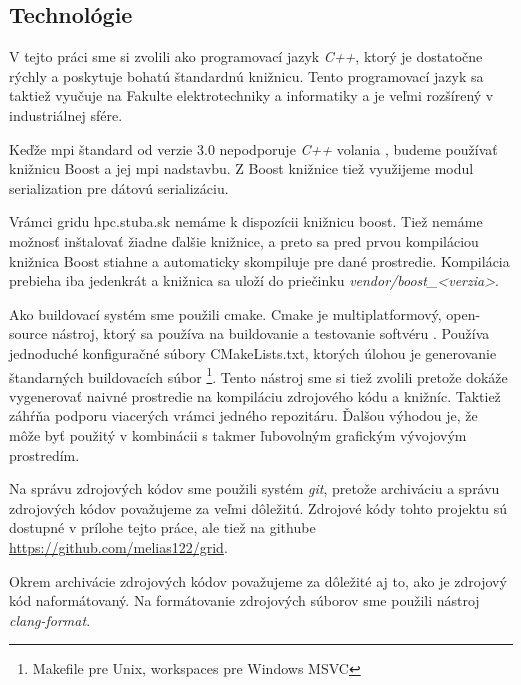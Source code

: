 \subsection{Technológie}
V tejto práci sme si zvolili ako programovací jazyk \textit{C++}, ktorý je dostatočne rýchly a poskytuje bohatú štandardnú knižnicu.
Tento programovací jazyk sa taktiež vyučuje na Fakulte elektrotechniky a informatiky a je veľmi rozšírený v industriálnej sfére.

Keďže \acrshort{mpi} štandard od verzie 3.0 nepodporuje \textit{C++} volania \cite{mpi3-1},
budeme používať knižnicu Boost a jej \acrshort{mpi} nadstavbu. Z Boost knižnice tiež využijeme modul serialization pre dátovú serializáciu.

Vrámci gridu hpc.stuba.sk nemáme k dispozícii knižnicu boost. Tiež nemáme možnosť inštalovať žiadne ďalšie knižnice,
a preto sa pred prvou kompiláciou knižnica Boost stiahne a automaticky skompiluje pre dané prostredie.
Kompilácia prebieha iba jedenkrát a knižnica sa uloží do priečinku \textit{vendor/boost\_<verzia>}.

Ako buildovací systém sme použili cmake.
Cmake je multiplatformový, open-source nástroj, ktorý sa používa na buildovanie a testovanie softvéru \cite{cmake-doc}.
Používa jednoduché konfiguračné súbory CMakeLists.txt, ktorých úlohou je generovanie štandarných buildovacích súbor \footnote{Makefile pre Unix, workspaces pre Windows MSVC}. Tento nástroj sme si tiež zvolili pretože dokáže vygenerovať naivné prostredie na kompiláciu zdrojového kódu a knižníc.
Taktiež záhŕňa podporu viacerých  vrámci jedného repozitáru.
Ďalšou výhodou je, že môže byť použitý v kombinácii s takmer ľubovolným grafickým vývojovým prostredím.

Na správu zdrojových kódov sme použili systém \textit{git}, pretože archiváciu a správu zdrojových kódov považujeme za veľmi dôležitú.
Zdrojové kódy tohto projektu sú dostupné v prílohe tejto práce, ale tiež na githube \url{https://github.com/melias122/grid}.

Okrem archivácie zdrojových kódov považujeme za dôležité aj to, ako je zdrojový kód naformátovaný.
Na formátovanie zdrojových súborov sme použili nástroj \textit{clang-format}.

